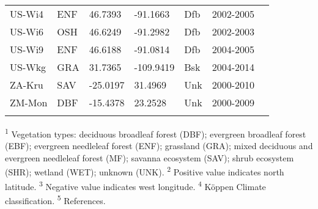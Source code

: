 \documentclass[a4paper, 12pt]{article}
\begin{document}
\begin{longtable}{l l l l l l l}
US-Wi4 & ENF & 46.7393 & -91.1663 & Dfb & 2002-2005 & \cite{US-Wi4} \\
US-Wi6 & OSH & 46.6249 & -91.2982 & Dfb & 2002-2003 & \cite{US-Wi6} \\
US-Wi9 & ENF & 46.6188 & -91.0814 & Dfb & 2004-2005 & \cite{US-Wi9} \\
US-Wkg & GRA & 31.7365 & -109.9419 & Bsk & 2004-2014 & \cite{US-Wkg} \\
ZA-Kru & SAV & -25.0197 & 31.4969 & Unk & 2000-2010 & \cite{ZA-Kru} \\
ZM-Mon & DBF & -15.4378 & 23.2528 & Unk & 2000-2009 & \cite{ZM-Mon} \\[1ex] %
\hline %
\label{tab:longtable} %
\end{longtable}

\textsuperscript{1} Vegetation types: deciduous broadleaf forest (DBF); evergreen broadleaf forest (EBF); evergreen needleleaf forest (ENF); grassland (GRA); mixed deciduous and evergreen needleleaf forest (MF); savanna ecosystem (SAV); shrub ecosystem (SHR); wetland (WET); unknown (UNK). \textsuperscript{2} Positive value indicates north latitude. \textsuperscript{3} Negative value indicates west longitude. \textsuperscript{4} K{\"o}ppen Climate classification. \textsuperscript{5} References.

\medskip



\end{document}
